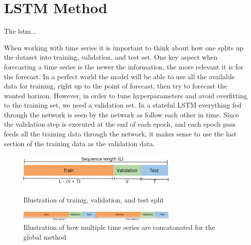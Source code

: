 \section{LSTM Method}
The lstm...

When working with time series it is important to think about how one splits up
the dataset into training, validation, and test set.
One key aspect when forecasting a time series is the newer the information,
the more relevant it is for the forecast.
In a perfect world the model will be able to use all the available data for training,
right up to the point of forecast, then try to forecast the wanted horizon.
However, in order to tune hyperparameters and avoid overfitting to the training
set, we need a validation set.
In a stateful LSTM everything fed through the network is seen by the network
as follow each other in time. Since the validation step is executed at the end of
each epoch, and each epoch pass feeds all the training data through the network,
it makes sense to use the last section of the training data as the validation data.

\begin{figure}[h!]
  \centering
  \includegraphics[width=0.7\textwidth]{./figs/illustrations/illustration_train_val_test_split.png}
  \hfill
  \caption{Illustration of trainig, validation, and test split}
  \label{fig:train-val-test-split}
\end{figure}

\begin{figure}[h!]
  \centering
  \includegraphics[width=0.7\textwidth]{./figs/illustrations/illustration_global_time_series.png}
  \hfill
  \caption{Illustration of how multiple time series are concatonated for the global method}
  \label{fig:global-time-series}
\end{figure}






